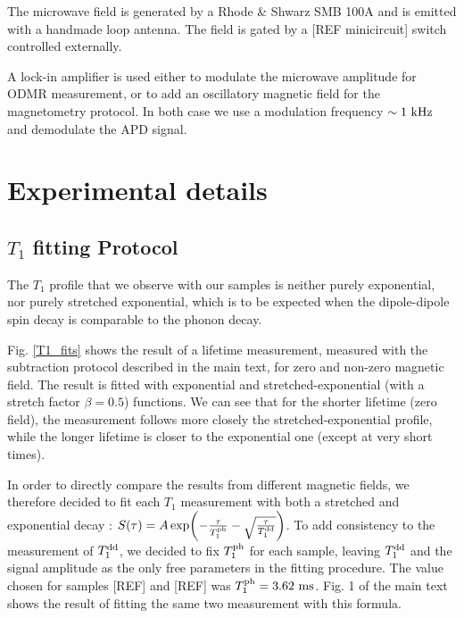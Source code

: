 \documentclass[preprintnumbers,amsmath,amssymb,onecolumn,12pt]{revtex4-2}
\begin{document}
The microwave field is generated by a Rhode \& Shwarz SMB 100A and is emitted with a handmade loop antenna. The field is gated by a [REF minicircuit] switch controlled externally.

A lock-in amplifier is used either to modulate the microwave amplitude for ODMR measurement, or to add an oscillatory magnetic field for the magnetometry protocol. In both case we use a modulation frequency $\sim 1\ \rm kHz$ and demodulate the APD signal.
\section{Experimental details}
\subsection{$T_1$ fitting Protocol}
The $T_1$ profile that we observe with our samples is neither purely exponential, nor purely stretched exponential, which is to be expected when the dipole-dipole spin decay is comparable to the phonon decay.

Fig. \ref{T1_fits} shows the result of a lifetime measurement, measured with the subtraction protocol described in the main text, for zero and non-zero magnetic field. The result is fitted with exponential and stretched-exponential (with a stretch factor $\beta=0.5$) functions. We can see that for the shorter lifetime (zero field), the measurement follows more closely the stretched-exponential profile, while the longer lifetime is closer to the exponential one (except at very short times).

In order to directly compare the results from different magnetic fields, we therefore decided to fit each $T_1$ measurement with both a stretched and exponential decay : $S(\tau)=A \exp (-\frac{\tau}{T_1^{\rm ph}} -\sqrt{\frac{\tau}{T_1^{\rm dd}}})$.
To add consistency to the measurement of $T_1^{\rm dd}$, we decided to fix $T_1^{\rm ph}$ for each sample, leaving $T_1^{\rm dd}$ and the signal amplitude as the only free parameters in the fitting procedure. The value chosen for samples [REF] and [REF] was $T_1^{\rm ph}=3.62\ \rm ms$. Fig. 1 of the main text shows the result of fitting the same two measurement with this formula.
\end{document}
